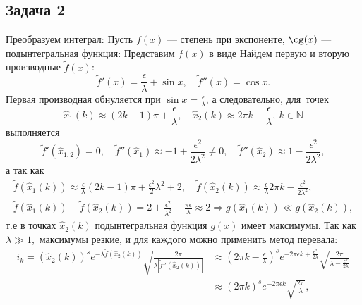\def \picdir{pic/}
\subsection*{Задача 2}
Преобразуем интеграл:
Пусть $f(x)$ --- степень при экспоненте, $\cg(x)$ --- подынтегральная функция:
Представим $f(x)$ в виде
Найдем первую и вторую производные $\tilde{f}(x)$:
\begin{equation*}
  \tilde{f}'(x) = \frac{\epsilon}{\lambda} + \sin{x},\quad \tilde{f}''(x) = \cos{x}.
\end{equation*}
Первая производная обнуляется при $\sin{x} = \frac{\epsilon}{\lambda}$, а следовательно, для\
точек
\begin{equation*}
  \hat{x}_1(k) \approx (2k - 1)\pi + \frac{\epsilon}{\lambda},\quad \hat{x}_2(k) \approx 2 \pi k - \frac{\epsilon}{\lambda},\ k \in \mathbb{N}
\end{equation*}
выполняется
\begin{equation*}
  \tilde{f}'(\hat{x}_{1,2}) = 0,\quad \tilde{f}''(\hat{x}_1) \approx - 1 + \frac{\epsilon^2}{2\lambda^2} \ne 0,\quad \tilde{f}''(\hat{x}_2) \approx 1 - \frac{\epsilon^2}{2 \lambda^2},
\end{equation*}
а так как
\begin{gather*}
  \tilde{f}(\hat{x}_1(k)) \approx \frac{\epsilon}{\lambda}(2k-1)\pi + \frac{\epsilon^2}2{\lambda^2} + 2,\quad \tilde{f}(\hat{x}_2(k)) \approx \frac{\epsilon}{\lambda}2 \pi k - \frac{\epsilon^2}{2\lambda^2},\\
  \tilde{f}(\hat{x}_1(k)) - \tilde{f}(\hat{x}_2(k)) = 2 + \frac{\epsilon^2}{\lambda^2} - \frac{\pi \epsilon}{\lambda} \approx 2 \Rightarrow g(\hat{x}_1(k)) \ll g(\hat{x}_2(k)),
\end{gather*}
т.е в точках $\hat{x}_2(k)$ подынтегральная функция $g(x)$ имеет максимумы. Так как $\lambda \gg 1$,\
максимумы резкие, и для каждого можно применить метод перевала:
\begin{align*}
  i_k = \left(\hat{x}_2(k) \right)^se^{-\lambda \tilde{f}(\hat{x}_2(k))}\sqrt{\frac{2 \pi}{\lambda| \tilde{f}''(\hat{x}_2(k))|}} &\approx \left(2 \pi k - \frac{\epsilon}{\lambda}\right)^se^{-2 \pi \epsilon k + \frac{\epsilon^2}{2 \lambda}} \sqrt{\frac{2 \pi}{\lambda - \frac{\epsilon^2}{2 \lambda}}}\\
  &\approx (2 \pi k)^se^{-2 \pi \epsilon k}\sqrt{\frac{2 \pi}{\lambda}},
\end{align*}
